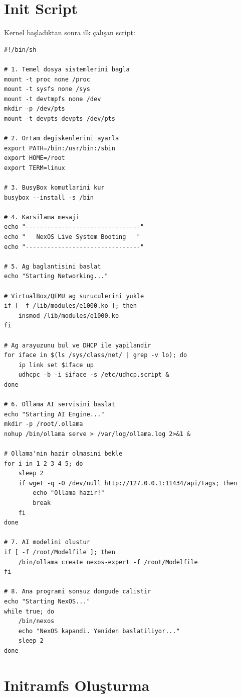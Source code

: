 \documentclass[12pt,a4paper]{report}
\begin{document}
\section{Init Script}

Kernel başladıktan sonra ilk çalışan script:

\begin{lstlisting}[style=bashstyle,caption={/init - Boot Scripti}]
#!/bin/sh

# 1. Temel dosya sistemlerini bagla
mount -t proc none /proc
mount -t sysfs none /sys
mount -t devtmpfs none /dev
mkdir -p /dev/pts
mount -t devpts devpts /dev/pts

# 2. Ortam degiskenlerini ayarla
export PATH=/bin:/usr/bin:/sbin
export HOME=/root
export TERM=linux

# 3. BusyBox komutlarini kur
busybox --install -s /bin

# 4. Karsilama mesaji
echo "--------------------------------"
echo "   NexOS Live System Booting   "
echo "--------------------------------"

# 5. Ag baglantisini baslat
echo "Starting Networking..."

# VirtualBox/QEMU ag suruculerini yukle
if [ -f /lib/modules/e1000.ko ]; then
    insmod /lib/modules/e1000.ko
fi

# Ag arayuzunu bul ve DHCP ile yapilandir
for iface in $(ls /sys/class/net/ | grep -v lo); do
    ip link set $iface up
    udhcpc -b -i $iface -s /etc/udhcp.script &
done

# 6. Ollama AI servisini baslat
echo "Starting AI Engine..."
mkdir -p /root/.ollama
nohup /bin/ollama serve > /var/log/ollama.log 2>&1 &

# Ollama'nin hazir olmasini bekle
for i in 1 2 3 4 5; do
    sleep 2
    if wget -q -O /dev/null http://127.0.0.1:11434/api/tags; then
        echo "Ollama hazir!"
        break
    fi
done

# 7. AI modelini olustur
if [ -f /root/Modelfile ]; then
    /bin/ollama create nexos-expert -f /root/Modelfile
fi

# 8. Ana programi sonsuz dongude calistir
echo "Starting NexOS..."
while true; do
    /bin/nexos
    echo "NexOS kapandi. Yeniden baslatiliyor..."
    sleep 2
done
\end{lstlisting}

\section{Initramfs Oluşturma}
\end{document}
